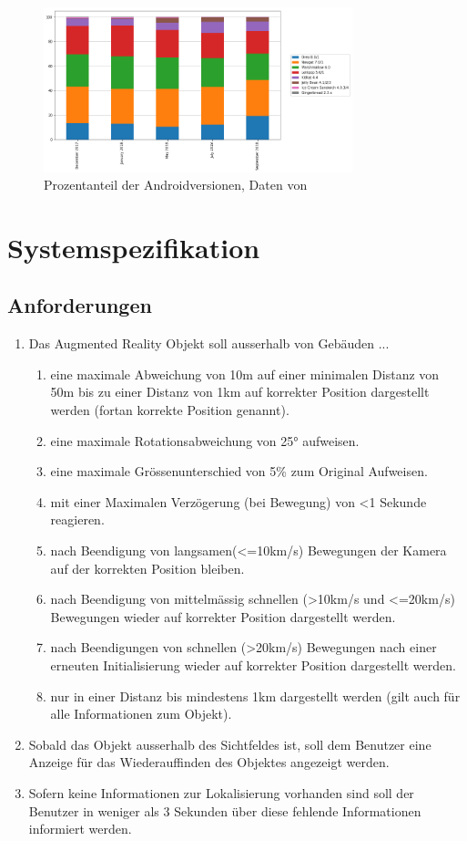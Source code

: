 \documentclass[a4paper]{scrreprt}
\begin{document}
\begin{figure}
	\centering
	\includegraphics[keepaspectratio,width=0.8\textwidth]{AndroidMarketshare}
	\caption{Prozentanteil der Androidversionen, Daten von \cite{Fossbytes2018}}
	\label{fig:AndroidMarketshare}
\end{figure}


\newpage
\section{Systemspezifikation}
\label{sec:SysSpec}

\subsection{Anforderungen}
\begin{enumerate}
	\item Das Augmented Reality Objekt soll ausserhalb von Gebäuden ...
	\begin{enumerate}[label*=\arabic*.]
		\item eine maximale Abweichung von 10m auf einer minimalen Distanz von 50m bis zu einer Distanz von 1km auf korrekter Position dargestellt werden (fortan korrekte Position genannt).
		\item eine maximale Rotationsabweichung von \ang{25} aufweisen.
		\item eine maximale Grössenunterschied von 5\% zum Original Aufweisen.
		\item mit einer Maximalen Verzögerung (bei Bewegung) von <1 Sekunde reagieren.
		\item nach Beendigung von langsamen(<=10km/s) Bewegungen der Kamera auf der korrekten Position bleiben.
		\item nach Beendigung von mittelmässig schnellen (>10km/s und <=20km/s) Bewegungen wieder auf korrekter Position dargestellt werden.
		\item nach Beendigungen von schnellen (>20km/s) Bewegungen nach einer erneuten Initialisierung wieder auf korrekter Position dargestellt werden.
		\item nur in einer Distanz bis mindestens 1km dargestellt werden (gilt auch für alle Informationen zum Objekt).
	\end{enumerate}
	\item Sobald das Objekt ausserhalb des Sichtfeldes ist, soll dem Benutzer eine Anzeige für das Wiederauffinden des Objektes angezeigt werden.
	\item Sofern keine Informationen zur Lokalisierung vorhanden sind soll der Benutzer in weniger als 3 Sekunden über diese fehlende Informationen informiert werden.
\end{enumerate}
\end{document}
